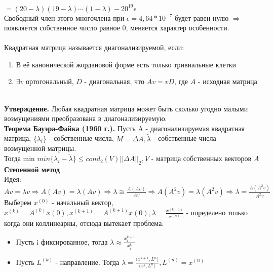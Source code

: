     \(= (20- \lambda)(19-\lambda)\cdots(1-\lambda)-20^{19}\epsilon\) \\
    Свободный член этого многочлена при \(\epsilon = 4,64*10^{-7}\) будет равен нулю \(\Rightarrow\) появляется собственное число равное 0, меняется характер особенности. \\ \\
    Квадратная матрица называется диагонализируемой, если:
    \begin{enumerate}
        \item В её канонической жордановой форме есть только тривиальные клетки
        \item \(\exists v\) ортогональный, \(D\) - диагональная, что \(Av = vD\), где \(A\) - исходная матрица
    \end{enumerate} \\

    \textbf{Утверждение.} Любая квадратная матрица может быть сколько угодно малыми возмущениями преобразована в диагонализируемую. \\
    
    \textbf{Теорема Бауэра-Файка (1960 г.).} Пусть A - диагонализируемая квадратная матрица, \(\{\lambda_i\}\) - собственные числа, \(M = \Delta A,\tilde{\lambda}\) - собственные числа возмущенной матрицы. \\
    Тогда min \(min\{\lambda_i - \tilde{\lambda}\} \leq cond_2(V) ||\Delta A||_2 , V\) - матрица собственных векторов \(A\) \\
    
    \textbf{Степенной метод} \\
    Идея: \(Av = \lambda v \Rightarrow A(Av) = \lambda(Av) \Rightarrow \lambda \cong \frac{A(Av)}{Av} \Rightarrow A(A^2v) = \lambda(A^2v) \Rightarrow \lambda = \frac{A(A^2v)}{A^2v}\) \\
    
    Выберем \(x^{(0)}\) - начальный вектор,\( x^{(k)} = A^{(k)}x{(0)}, x^{(k + 1)} = A^{(k + 1)}x{(0)}, \lambda = \frac{x^{(k+1)}}{x^{(n)}}\) - определено только когда они коллинеарны, отсюда вытекает проблема. \\

    \begin{itemize}
        \item Пусть i фиксированное, тогда \(\lambda \approx \frac{x_i^{k+1}}{x_i^{k}}\)
        \item Пусть \(L^{(k)}\) - направление. Тогда \(\lambda = \frac{\langle x^{k+1}, L^{n} \rangle}{\langle x^{k}, L^{n} \rangle}, L^{(n)} = x^{(n)}\)
    \end{itemize} \\

